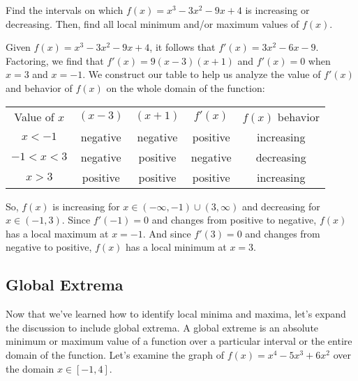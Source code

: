 \begin{Exercise}[label=locext1]
Find the intervals on which $f(x)=x^3-3x^2-9x+4$ is increasing or decreasing. 
Then, find all local minimum and/or maximum values of $f(x)$. 
\end{Exercise}

\begin{Answer}[ref=locext1]
Given $f(x)=x^3-3x^2-9x+4$, it follows that $f'(x)=3x^2-6x-9$. Factoring, we 
find that $f'(x) = 9(x-3)(x+1)$ and $f'(x) = 0$ when $x=3$ and $x=-1$. We 
construct our table to help us analyze the value of $f'(x)$ and behavior of 
$f(x)$ on the whole domain of the function:
\begin{center}
	\begin{tabular}{c|c|c|c|c}
		Value of $x$ & $(x-3)$ & $(x+1)$ & $f'(x)$ & $f(x)$ behavior\\
		$x<-1$ & negative & negative & positive & increasing\\
		$-1<x<3$ & negative & positive & negative & decreasing\\
		$x>3$ & positive & positive & positive & increasing
	\end{tabular}
\end{center}
So, $f(x)$ is increasing for $x \in (-\infty, -1) \cup (3, \infty)$ and 
decreasing for $x \in (-1, 3)$. Since $f'(-1)=0$ and changes from positive to 
negative, $f(x)$ has a local maximum at $x=-1$. And since $f'(3)=0$ and 
changes from negative to positive, $f(x)$ has a local minimum at $x=3$.
\end{Answer}



\subsection{Global Extrema}
Now that we've learned how to identify local minima and maxima, let's expand 
the discussion to include global extrema. A global extreme is an absolute 
minimum or maximum value of a function over a particular interval or the entire 
domain of the function. Let's examine the graph of $f(x) = x^4-5x^3+6x^2$ over 
the domain $x \in [-1,4]$.


